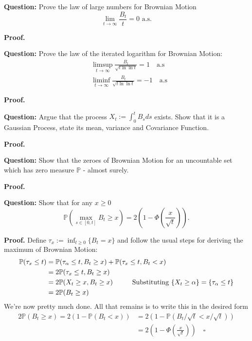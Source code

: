 \documentclass{article}
\begin{document}
\begin{tcolorbox}[colframe=black,colback=gray!5,boxrule=0.5pt]
\textbf{Question:} Prove the law of large numbers for Brownian Motion
$$\lim_{t\to\infty}\frac{B_t}{t} = 0 \text{ a.s.}$$
\end{tcolorbox}
\textbf{Proof.}

\begin{tcolorbox}[colframe=black,colback=gray!5,boxrule=0.5pt]
\textbf{Question:} Prove the law of the iterated logarithm for Brownian Motion:
\begin{align*}
    & \limsup_{t\to\infty}\frac{B_t}{\sqrt{t\ln\ln t}}=1\quad \text{a.s} \\
    & \liminf_{t\to\infty}\frac{B_t}{\sqrt{t\ln\ln t}}=-1\quad \text{a.s}
\end{align*}
\end{tcolorbox}
\textbf{Proof.}

\begin{tcolorbox}[colframe=black,colback=gray!5,boxrule=0.5pt]
\textbf{Question:} Argue that the process $X_t := \int_0^t B_sds$ exists. Show that it is a Gaussian Process, state its mean, variance and Covariance Function.
\end{tcolorbox}
\textbf{Proof.}

\begin{tcolorbox}[colframe=black,colback=gray!5,boxrule=0.5pt]
\textbf{Question:} Show that the zeroes of Brownian Motion for an uncountable set which has zero measure $\mathbb{P}$ - almost surely.
\end{tcolorbox}
\textbf{Proof.}


\begin{tcolorbox}[colframe=black,colback=gray!5,boxrule=0.5pt]
\textbf{Question:} Show that for any $x\geq 0$ 
$$\mathbb{P}(\max_{s\in[0,t]} B_t\geq x) = 2\left(1- \Phi\left(\frac{x}{\sqrt{t}}\right)\right).$$
\end{tcolorbox}
\textbf{Proof.} Define $\tau_x := \inf_{t\geq0}\{B_t=x\}$ and follow the usual steps for deriving the maximum of Brownian Motion: 
\begin{align*}
    \mathbb{P}(\tau_x \leq t) &= \mathbb{P}(\tau_\alpha\leq t, B_t \geq x) + \mathbb{P}(\tau_x\leq t, B_t < x) \\
    &= 2\mathbb{P}(\tau_x\leq t, B_t \geq x) \\
    &= 2\mathbb{P}(X_t\geq x, B_t\geq x) \hspace{10mm}\text{{Substituting $\{X_t\geq\alpha\} = \{\tau_\alpha \leq t\}$}} \\
    &= 2\mathbb{P}(B_t\geq x) \\
\end{align*}
We're now pretty much done. All that remains is to write this in the desired form
\begin{align*}
    2\mathbb{P}(B_t\geq x) = 2(1 - \mathbb{P}(B_t <x))  &= 2(1 - \mathbb{P}(B_t/\sqrt{t} <x/\sqrt{t})) \\
    &= 2\left(1- \Phi\left(\frac{x}{\sqrt{t}}\right)\right) \quad\square
\end{align*}
\end{document}
